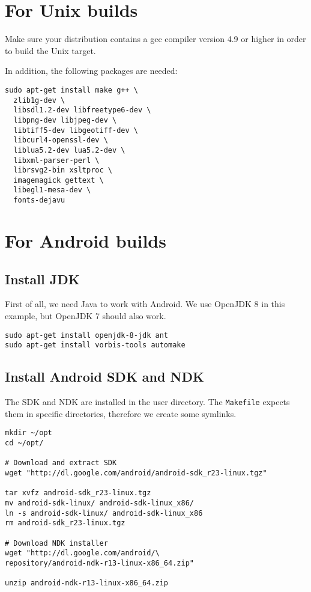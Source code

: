 \section{For Unix builds}

Make sure your distribution contains a gcc compiler version 4.9 or higher in order to build the Unix target.

In addition, the following packages are needed:

\begin{verbatim}
sudo apt-get install make g++ \
  zlib1g-dev \
  libsdl1.2-dev libfreetype6-dev \
  libpng-dev libjpeg-dev \
  libtiff5-dev libgeotiff-dev \
  libcurl4-openssl-dev \
  liblua5.2-dev lua5.2-dev \
  libxml-parser-perl \
  librsvg2-bin xsltproc \
  imagemagick gettext \
  libegl1-mesa-dev \
  fonts-dejavu
\end{verbatim}

\section{For Android  builds}
\subsection{Install JDK}
First of all, we need Java to work with Android. We use OpenJDK 8 in this example, but OpenJDK 7 should also work.

\begin{verbatim}
sudo apt-get install openjdk-8-jdk ant
sudo apt-get install vorbis-tools automake
\end{verbatim}

\subsection{Install Android SDK and NDK}

The SDK and NDK are installed in the user directory. The \texttt{Makefile} expects them in specific directories, therefore we create some symlinks.

\begin{verbatim}
mkdir ~/opt
cd ~/opt/

# Download and extract SDK
wget "http://dl.google.com/android/android-sdk_r23-linux.tgz"

tar xvfz android-sdk_r23-linux.tgz
mv android-sdk-linux/ android-sdk-linux_x86/
ln -s android-sdk-linux/ android-sdk-linux_x86
rm android-sdk_r23-linux.tgz

# Download NDK installer
wget "http://dl.google.com/android/\
repository/android-ndk-r13-linux-x86_64.zip"

unzip android-ndk-r13-linux-x86_64.zip
\end{verbatim}

